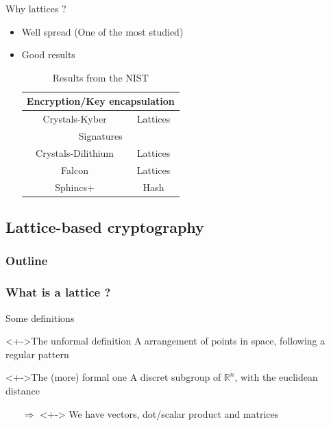 \documentclass{beamer}
\begin{document}
\begin{frame}{Why lattices ?}
	\begin{itemize}
		\item Well spread (One of the most studied)
		\item Good results
			\begin{table}[h!]
			\begin{tabular}{|c|c|}
				\hline
				\multicolumn{2}{|c|}{Encryption/Key encapsulation} \\
				\hline
				Crystals-Kyber & Lattices \\
				\hline
				\multicolumn{2}{|c|}{Signatures} \\
				\hline
				Crystals-Dilithium & Lattices \\
				Falcon & Lattices \\
				Sphincs+ & Hash \\
				\hline
			\end{tabular}
			\center
			\caption{Results from the NIST}
			\end{table}
	\end{itemize}
\end{frame}

\subsection{Lattice-based cryptography}
\begin{frame}
  \frametitle{Outline}
\end{frame}

\subsubsection{What is a lattice ?}
\begin{frame}{Some definitions}
	\begin{block}<+->{The unformal definition}
		A arrangement of points in space, following a regular pattern
	\end{block}

	\begin{block}<+->{The (more) formal one}
		A discret subgroup of $\mathbb{R}^n$, with the euclidean distance
	\end{block}
	\begin{itemize}
		\item[$\Rightarrow$]<+-> We have vectors, dot/scalar product and matrices
	\end{itemize}
\end{frame}
\end{document}

